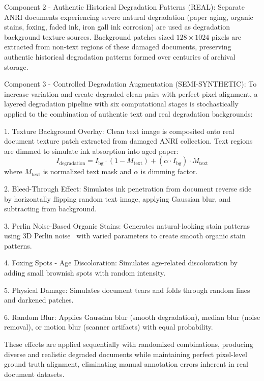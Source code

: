 \documentclass[journal]{IEEEtran}
\begin{document}
Component 2 - Authentic Historical Degradation Patterns (REAL):
Separate ANRI documents experiencing severe natural degradation (paper aging, organic stains, foxing, faded ink, iron gall ink corrosion) are used as degradation background texture sources. Background patches sized $128 \times 1024$ pixels are extracted from non-text regions of these damaged documents, preserving authentic historical degradation patterns formed over centuries of archival storage.

Component 3 - Controlled Degradation Augmentation (SEMI-SYNTHETIC):
To increase variation and create degraded-clean pairs with perfect pixel alignment, a layered degradation pipeline with six computational stages is stochastically applied to the combination of authentic text and real degradation backgrounds:

1. Texture Background Overlay:
Clean text image is composited onto real document texture patch extracted from damaged ANRI collection. Text regions are dimmed to simulate ink absorption into aged paper:
\begin{equation}
I_{\text{degradation}} = I_{\text{bg}} \cdot (1 - M_{\text{text}}) + (\alpha \cdot I_{\text{bg}}) \cdot M_{\text{text}}
\end{equation}
where $M_{\text{text}}$ is normalized text mask and $\alpha$ is dimming factor.

2. Bleed-Through Effect:
Simulates ink penetration from document reverse side by horizontally flipping random text image, applying Gaussian blur, and subtracting from background.

3. Perlin Noise-Based Organic Stains:
Generates natural-looking stain patterns using 3D Perlin noise~\cite{perlin1985image} with varied parameters to create smooth organic stain patterns.

4. Foxing Spots - Age Discoloration:
Simulates age-related discoloration by adding small brownish spots with random intensity.

5. Physical Damage:
Simulates document tears and folds through random lines and darkened patches.

6. Random Blur:
Applies Gaussian blur (smooth degradation), median blur (noise removal), or motion blur (scanner artifacts) with equal probability.

These effects are applied sequentially with randomized combinations, producing diverse and realistic degraded documents while maintaining perfect pixel-level ground truth alignment, eliminating manual annotation errors inherent in real document datasets.
\end{document}
